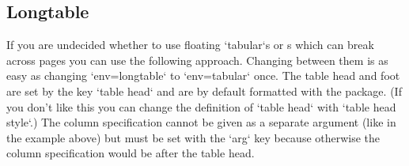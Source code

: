 \subsection{Longtable}
\label{longtable}
If you are undecided whether to use floating `tabular`s or s which can break across pages you can use the following approach.
Changing between them is as easy as changing `env=longtable` to `env=tabular` once.
The table head and foot are set by the key `table head` and are by default formatted with the  package.
(If you don't like this you can change the definition of `table head` with `table head style`.)
The column specification cannot be given as a separate argument (like in the example above) but must be set with the `arg` key
because otherwise the column specification would be after the table head.

